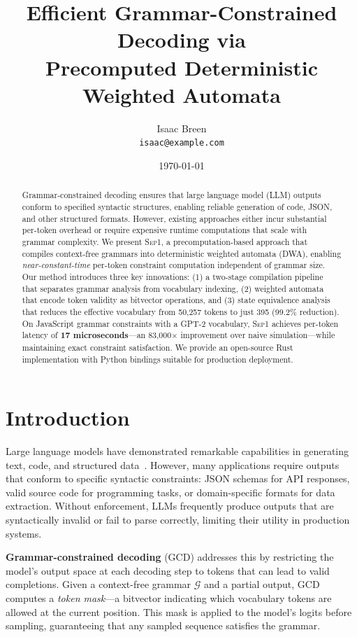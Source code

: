 \documentclass[11pt,a4paper]{article}
\title{Efficient Grammar-Constrained Decoding via\\Precomputed Deterministic Weighted Automata}
\author{
  Isaac Breen\\
  \texttt{isaac@example.com}
}
\date{\today}
\newcommand{\grammar}{\mathcal{G}}
\newcommand{\sep}{\textsc{Sep1}}
\theoremstyle{plain}
\theoremstyle{definition}
\theoremstyle{remark}
\begin{document}
\maketitle

\begin{abstract}
Grammar-constrained decoding ensures that large language model (LLM) outputs conform to specified syntactic structures, enabling reliable generation of code, JSON, and other structured formats. However, existing approaches either incur substantial per-token overhead or require expensive runtime computations that scale with grammar complexity. We present \sep{}, a precomputation-based approach that compiles context-free grammars into deterministic weighted automata (DWA), enabling \emph{near-constant-time} per-token constraint computation independent of grammar size. Our method introduces three key innovations: (1) a two-stage compilation pipeline that separates grammar analysis from vocabulary indexing, (2) weighted automata that encode token validity as bitvector operations, and (3) state equivalence analysis that reduces the effective vocabulary from 50,257 tokens to just 395 (99.2\% reduction). On JavaScript grammar constraints with a GPT-2 vocabulary, \sep{} achieves per-token latency of \textbf{17 microseconds}---an 83,000$\times$ improvement over naive simulation---while maintaining exact constraint satisfaction. We provide an open-source Rust implementation with Python bindings suitable for production deployment.
\end{abstract}

\section{Introduction}
\label{sec:introduction}

Large language models have demonstrated remarkable capabilities in generating text, code, and structured data~\citep{vaswani2017attention}. However, many applications require outputs that conform to specific syntactic constraints: JSON schemas for API responses, valid source code for programming tasks, or domain-specific formats for data extraction. Without enforcement, LLMs frequently produce outputs that are syntactically invalid or fail to parse correctly, limiting their utility in production systems.

\textbf{Grammar-constrained decoding} (GCD) addresses this by restricting the model's output space at each decoding step to tokens that can lead to valid completions. Given a context-free grammar $\grammar$ and a partial output, GCD computes a \emph{token mask}---a bitvector indicating which vocabulary tokens are allowed at the current position. This mask is applied to the model's logits before sampling, guaranteeing that any sampled sequence satisfies the grammar.
\end{document}
